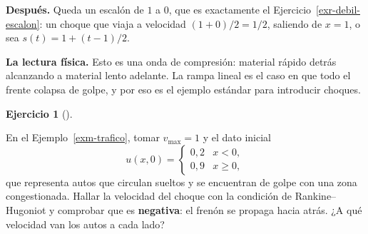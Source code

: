 \documentclass[
  spanish,
  a4paper,
]{scrbook}
\theoremstyle{definition}
\theoremstyle{plain}
\theoremstyle{definition}
\theoremstyle{plain}
\theoremstyle{definition}
\newtheorem{exercise}{Ejercicio}[chapter]
\theoremstyle{remark}
\begin{document}
\begin{tcolorbox}
\textbf{Después.} Queda un escalón de \(1\) a \(0\), que es exactamente
el Ejercicio~\ref{exr-debil-escalon}: un choque que viaja a velocidad
\((1+0)/2 = 1/2\), saliendo de \(x=1\), o sea \(s(t) = 1 + (t-1)/2\).

\textbf{La lectura física.} Esto es una onda de compresión: material
rápido detrás alcanzando a material lento adelante. La rampa lineal es
el caso en que todo el frente colapsa de golpe, y por eso es el ejemplo
estándar para introducir choques.

\end{tcolorbox}

\begin{exercise}[]\protect\hypertarget{exr-trafico}{}\label{exr-trafico}

En el Ejemplo~\ref{exm-trafico}, tomar \(v_{\max}=1\) y el dato inicial
\[u(x,0) = \begin{cases} 0{,}2 & x<0,\\ 0{,}9 & x\ge 0,\end{cases}\] que
representa autos que circulan sueltos y se encuentran de golpe con una
zona congestionada. Hallar la velocidad del choque con la condición de
Rankine--Hugoniot y comprobar que es \textbf{negativa}: el frenón se
propaga hacia atrás. ¿A qué velocidad van los autos a cada lado?

\end{exercise}
\end{document}
